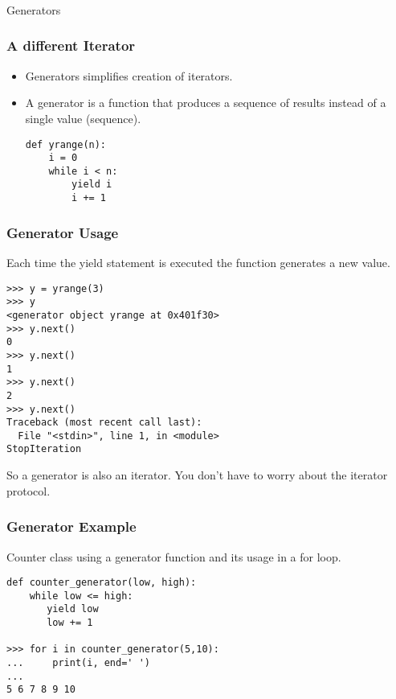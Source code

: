 \begin{frame}[fragile]\frametitle{}
\begin{center}
{\Large Generators}
\end{center}
\end{frame}


\begin{frame}[fragile]\frametitle{A different Iterator}

    \begin{itemize}
    \item  Generators simplifies creation of iterators. 
    \item A generator is a function that produces a sequence of results instead of a single value (sequence).
\begin{lstlisting}
def yrange(n):
    i = 0
    while i < n:
        yield i
        i += 1
\end{lstlisting}
    \end{itemize}
\end{frame}

\begin{frame}[fragile]\frametitle{Generator Usage}
Each time the yield statement is executed the function generates a new value.
\begin{lstlisting}
>>> y = yrange(3)
>>> y
<generator object yrange at 0x401f30>
>>> y.next()
0
>>> y.next()
1
>>> y.next()
2
>>> y.next()
Traceback (most recent call last):
  File "<stdin>", line 1, in <module>
StopIteration
\end{lstlisting}
So a generator is also an iterator. You don't have to worry about the iterator protocol.
\end{frame}

\begin{frame}[fragile]\frametitle{Generator Example}
Counter class using a generator function and its usage in a for loop.
\begin{lstlisting}
def counter_generator(low, high):
    while low <= high:
       yield low
       low += 1

>>> for i in counter_generator(5,10):
...     print(i, end=' ')
...
5 6 7 8 9 10
\end{lstlisting}
\end{frame}

